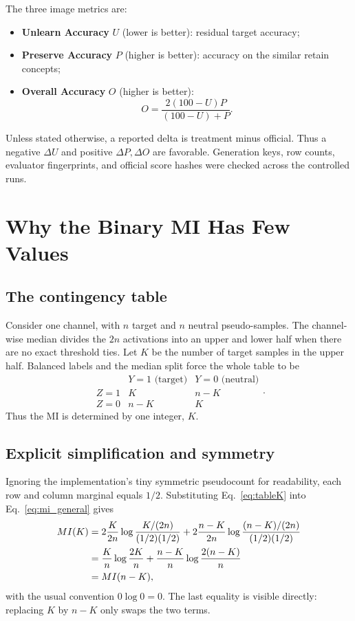 \documentclass[11pt]{article}
\begin{document}
The three image metrics are:
\begin{itemize}
    \item \textbf{Unlearn Accuracy} $U$ (lower is better): residual target accuracy;
    \item \textbf{Preserve Accuracy} $P$ (higher is better): accuracy on the similar retain concepts;
    \item \textbf{Overall Accuracy} $O$ (higher is better):
    \begin{equation}
        O=\frac{2(100-U)P}{(100-U)+P}.
        \label{eq:overall}
    \end{equation}
\end{itemize}
Unless stated otherwise, a reported delta is treatment minus official. Thus a negative $\Delta U$ and positive $\Delta P,\Delta O$ are favorable. Generation keys, row counts, evaluator fingerprints, and official score hashes were checked across the controlled runs.

\section{Why the Binary MI Has Few Values}
\label{sec:mi_math}
\subsection{The contingency table}
Consider one channel, with $n$ target and $n$ neutral pseudo-samples. The channel-wise median divides the $2n$ activations into an upper and lower half when there are no exact threshold ties. Let $K$ be the number of target samples in the upper half. Balanced labels and the median split force the whole table to be
\begin{equation}
\begin{array}{c|cc}
 & Y=1\text{ (target)} & Y=0\text{ (neutral)} \\ \hline
Z=1 & K & n-K \\
Z=0 & n-K & K
\end{array}.
\label{eq:tableK}
\end{equation}
Thus the MI is determined by one integer, $K$.

\subsection{Explicit simplification and symmetry}
Ignoring the implementation's tiny symmetric pseudocount for readability, each row and column marginal equals $1/2$. Substituting Eq.~\eqref{eq:tableK} into Eq.~\eqref{eq:mi_general} gives
\begin{align}
MI(K)
&=2\frac{K}{2n}
\log\frac{K/(2n)}{(1/2)(1/2)}
+2\frac{n-K}{2n}
\log\frac{(n-K)/(2n)}{(1/2)(1/2)} \notag\\
&=\frac{K}{n}\log\frac{2K}{n}
+\frac{n-K}{n}\log\frac{2(n-K)}{n} \notag\\
&=MI(n-K),
\label{eq:mi_closed}
\end{align}
with the usual convention $0\log0=0$. The last equality is visible directly: replacing $K$ by $n-K$ only swaps the two terms.
\end{document}
